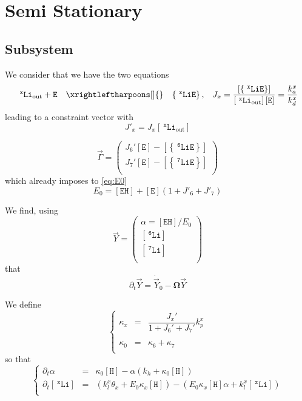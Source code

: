 \documentclass[aps,onecolumn,11pt]{revtex4}
\newcommand{\mychem}[1]{\mathtt{#1}}
\newcommand{\myconc}[1]{\left\lbrack{#1}\right\rbrack}
\newcommand{\spLi}[1]{{~^{\mychem{#1}}\mychem{Li}}}
\newcommand{\Li}[1]{\myconc{\spLi{#1}}}
\newcommand{\spEout}{\mychem{E}}
\newcommand{\Eout}{\myconc{\spEout}}
\newcommand{\spLiE}[1]{\left\lbrace\spLi{#1}\spEout\right\rbrace}
\newcommand{\LiE}[1]{\myconc{\spLiE{#1}}}
\newcommand{\spLiOut}[1]{{\spLi{#1}}_{\mathrm{out}}}
\newcommand{\LiOut}[1]{\myconc{\spLiOut{#1}}}
\newcommand{\spEHin}{\mychem{EH}}
\newcommand{\EHin}{\myconc{\spEHin}}
\newcommand{\spproton}{\mychem{H}}
\newcommand{\proton}{\myconc{\spproton}}
\newcommand{\mymat}[1]{{\bm{#1}}}
\begin{document}
\section{Semi Stationary}
\subsection{Subsystem}
We consider that we have the two equations
\begin{equation}
	\begin{array}{rcll}
	 \spLiOut{x} +  \spEout &  \xrightleftharpoons[]{} & \spLiE{x}, & J_x = \dfrac{\LiE{x}}{\LiOut{x} \Eout} = \dfrac{k_a^x}{k_d^x}\\
	 \end{array}
\end{equation}
leading to a constraint vector
with 
\begin{equation}
	J'_x = J_x \LiOut{x}
\end{equation}

\begin{equation}
\vec{\Gamma} = 
\begin{pmatrix}
	J_6' \Eout - \LiE{6} \\
	J_7' \Eout - \LiE{7} \\
\end{pmatrix}
\end{equation}
which already imposes to \eqref{eq:E0}
\begin{equation}
	E_0 = \EHin + \Eout \left(1+J'_6+J'_7\right)
\end{equation}

We find, using
\begin{equation}
	\vec{Y} = \begin{pmatrix}
	\alpha = \EHin/E_0\\
	\Li{6}\\
	\Li{7}\\
	\end{pmatrix}
\end{equation}
that
\begin{equation}
	\partial_t \vec{Y} = \dot{\vec{Y}}_0 - \mymat{\Omega}\vec{Y}
\end{equation}

We define
\begin{equation}
\left\lbrace
	\begin{array}{rcl}
		\kappa_x & = & \dfrac{J_x'}{1+J_6'+J_7'} k_p^x\\
		\\
		\kappa_0 & = & \kappa_6 + \kappa_7\\
	\end{array}
\right.
\end{equation}
so that
\begin{equation}
\left\lbrace
\begin{array}{rcl}
	\partial_t \alpha  & = & \kappa_0 \proton - \alpha \left(k_h + \kappa_0 \proton\right)\\
	\partial_t \Li{x}  & = & \left(k_l^x \theta_x + E_0\kappa_x \proton\right) -  \left(E_0\kappa_x \proton \alpha +k_l^x \Li{x}\right)\\
\end{array}
\right.
\end{equation}
\end{document}
